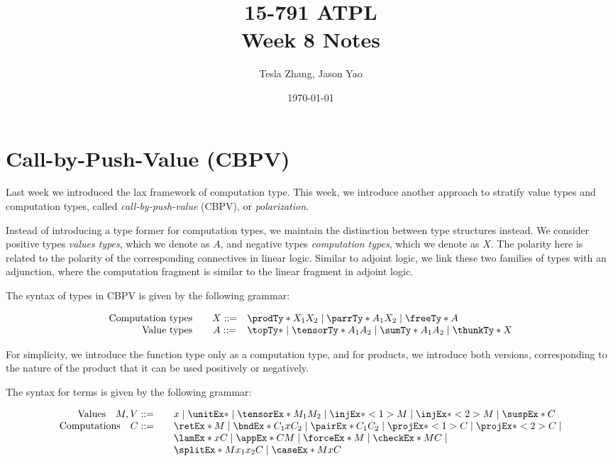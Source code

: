 \documentclass[letterpaper]{article}
\title{15-791 ATPL \\ Week 8 Notes}
\author{Tesla Zhang, Jason Yao}
\date{\today}
\begin{document}
\maketitle

\section{Call-by-Push-Value (CBPV)}
Last week we introduced the lax framework of computation type.
This week, we introduce another approach to stratify value types and computation types,
called \emph{call-by-push-value} (CBPV), or \emph{polarization}.

Instead of introducing a type former for computation types,
we maintain the distinction between type structures instead.
We consider positive types \emph{values types}, which we denote as $A$,
and negative types \emph{computation types}, which we denote as $X$.
The polarity here is related to the polarity of the corresponding connectives in linear logic.
Similar to adjoint logic, we link these two families of types with an adjunction,
where the computation fragment is similar to the linear fragment in adjoint logic.

The syntax of types in CBPV is given by the following grammar:

\[
  \begin{array}{rcl}
    \text{Computation types} \quad & X ::= & \prodTy*{X_1}{X_2} \mid \parrTy*{A_1}{X_2} \mid \freeTy*{A} \\
    \text{Value types} \quad       & A ::= & \topTy* \mid \tensorTy*{A_1}{A_2} \mid \sumTy*{A_1}{A_2} \mid \thunkTy*{X} \\
  \end{array}
\]

For simplicity, we introduce the function type only as a computation type,
and for products, we introduce both versions, corresponding to the nature of the product that
it can be used positively or negatively.

The syntax for terms is given by the following grammar:

\[
  \begin{array}{rcl}
    \text{Values} \quad M, V ::=
      && x \mid \unitEx* \mid \tensorEx*{M_1}{M_2} \mid \injEx*<1>{M} \mid \injEx*<2>{M} \mid \suspEx*{C} \\
    \text{Computations} \quad C ::=
      && \retEx*{M} \mid \bndEx*{C_1}{x}{C_2} \mid \pairEx*{C_1}{C_2} \mid \projEx*<1>{C} \mid \projEx*<2>{C} \mid \\
      && \lamEx*{x}{C} \mid \appEx*{C}{M} \mid \forceEx*{M} \mid \checkEx*{M}{C} \mid \\
      && \splitEx*{M}{x_1}{x_2}{C} \mid \caseEx* M x C
  \end{array}
\]
\end{document}
